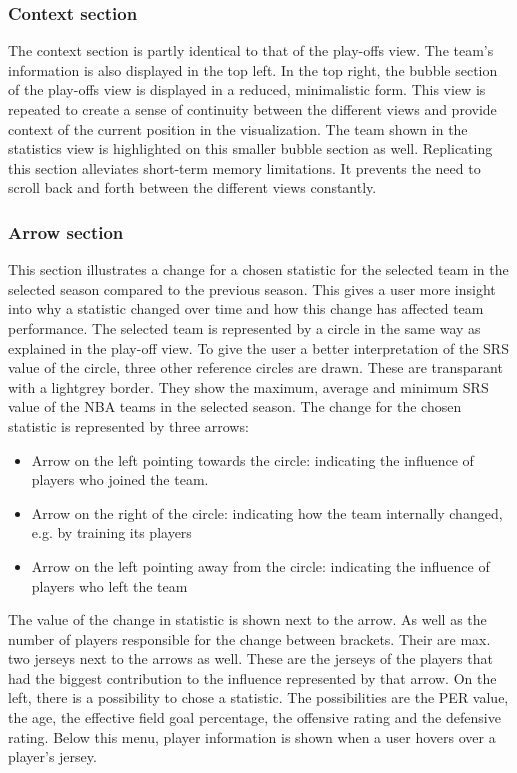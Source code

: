 \documentclass[]{sigchi}
\begin{document}
\subsubsection{Context section}
The context section is partly identical to that of the play-offs view. The
team's information is also displayed in the top left. In the top right, the
bubble section of the play-offs view is displayed in a reduced, minimalistic
form. This view is repeated to create a sense of continuity between the
different views and provide context of the current position in the
visualization. The team shown in the statistics view is highlighted on this
smaller bubble section as well. Replicating this section alleviates
short-term memory limitations. It prevents the need to scroll back and forth between
the different views constantly. 

\subsubsection{Arrow section}
This section illustrates a change for a chosen statistic for the selected team in 
the selected season compared to the previous season. This gives a user more 
insight into why a statistic changed over time and how this change has affected 
team performance. The selected team is represented by a circle in the same way as 
explained in the play-off view. To give the user a better interpretation of the SRS 
value of the circle, three other reference circles are drawn. These are 
transparant with a lightgrey border. They show the maximum, average and minimum SRS 
value of the NBA teams in the selected season. The change for the chosen statistic is 
represented by three arrows:
\begin{itemize}
    \item Arrow on the left pointing towards the circle: indicating the
        influence of players who joined the team.
    \item Arrow on the right of the circle: indicating how the team internally
        changed, e.g. by training its players
    \item Arrow on the left pointing away from the circle: indicating the
        influence of players who left the team 
\end{itemize}
The value of the change in statistic is shown next to the arrow. As well as the number of 
players responsible for the change between brackets. Their are max. two
jerseys next to the arrows as well. These are the jerseys of the players that 
had the biggest contribution to the influence represented by that arrow.  
On the left, there is a possibility to chose a statistic. The possibilities 
are the PER value, the age, the effective field goal percentage, the offensive rating 
and the defensive rating. Below this menu, player information is shown when a user hovers
over a player's jersey. 
\end{document}

